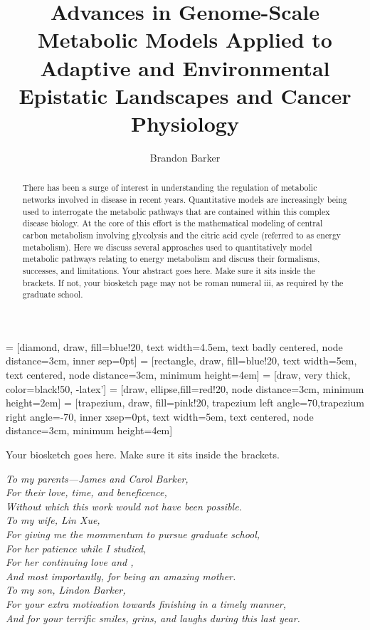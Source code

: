 \documentclass[phd,tocprelim]{cornell}
\title {Advances in Genome-Scale Metabolic Models Applied to Adaptive and Environmental Epistatic Landscapes and Cancer Physiology}
\author {Brandon Barker}
\theoremstyle{break}
\begin{document}
 = [diamond, draw, fill=blue!20,
    text width=4.5em, text badly centered, node distance=3cm, inner sep=0pt]
 = [rectangle, draw, fill=blue!20,
    text width=5em, text centered, node distance=3cm, minimum height=4em]
 = [draw, very thick, color=black!50, -latex']
 = [draw, ellipse,fill=red!20, node distance=3cm,
    minimum height=2em]
 = [trapezium, draw, fill=pink!20,
    trapezium left angle=70,trapezium right angle=-70, inner xsep=0pt,
    text width=5em, text centered, node distance=3cm, minimum height=4em]


\maketitle
\makecopyright

\begin{abstract}

There has been a surge of interest in understanding the regulation 
of metabolic networks involved in disease in recent years.  Quantitative 
models are increasingly being used to interrogate the metabolic pathways 
that are contained within this complex disease biology.  At the core of 
this effort is the mathematical modeling of central carbon metabolism involving 
glycolysis and the citric acid cycle (referred to as energy metabolism).  
Here we discuss several approaches used to quantitatively model metabolic 
pathways relating to energy metabolism and discuss their formalisms, successes, and limitations.
Your abstract goes here. Make sure it sits inside the brackets. If not,
your biosketch page may not be roman numeral iii, as required by the
graduate school.
\end{abstract}

\begin{biosketch}
Your biosketch goes here. Make sure it sits inside
the brackets.
\end{biosketch}

\begin{dedication}
\begin{center}
\textit{To my parents---James and Carol Barker, \\
For their love, time, and beneficence, \\
Without which this work would not have been possible. \\
\vspace{10 mm} 
To my wife, Lin Xue, \\
For giving me the mommentum to pursue graduate school, \\
For her patience while I studied, \\
For her continuing love and , \\
And most importantly, for being an amazing mother.\\
\vspace{10 mm} 
To my son, Lindon Barker, \\
For your extra motivation towards finishing in a timely manner, \\
And for your terrific smiles, grins, and laughs during this last year.}
\end{center}
\end{dedication}
\end{document}
